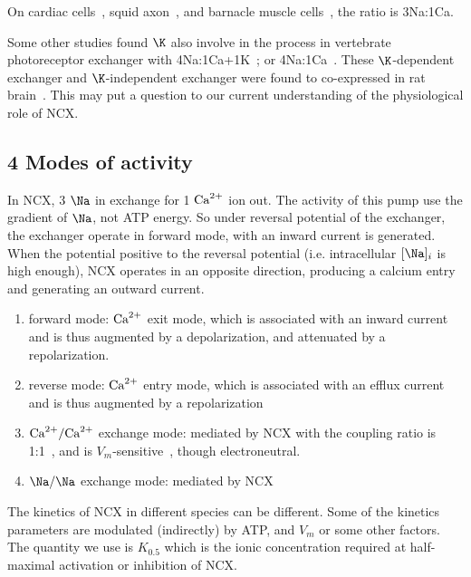 \begin{mdframed}


On cardiac cells~\citep{pitts1979, reeves1980, reeves1984, 
kimura1987,ehara1989}, squid axon~\citep{dipolo1990}, and barnacle muscle
cells~\citep{rasgado-flores1987, rasgado-flores1989}, the ratio is 3Na:1Ca.

Some other studies found $\K$ also involve in the process in vertebrate
photoreceptor exchanger with 4Na:1Ca+1K~\citep{dipoli1984, cervetto1989,
yasui1990}; or 4Na:1Ca~\citep{fukioka2000}. These $\K$-dependent exchanger and
$\K$-independent exchanger were found to co-expressed in rat
brain~\citep{tsoi1998}.  This may put a question to our current understanding of
the physiological role of NCX.

\end{mdframed}


\subsection{4 Modes of activity}
\label{sec:4-modes-activity}

In NCX, 3 $\Na$ in exchange for 1 ${\text{Ca}^{2+}}$ ion out. The activity of this pump use
the gradient of $\Na$, not ATP energy. So under reversal potential of the
exchanger, the exchanger operate in forward mode, with an inward current is
generated.
When the potential positive to the reversal potential (i.e. intracellular
$[\Na]_i$ is high enough), NCX operates in an opposite direction, producing a
calcium entry and generating an outward current.

\begin{enumerate}
\item forward mode: ${\text{Ca}^{2+}}$ exit mode, which is associated with an
  inward current and is thus augmented by a depolarization, and
  attenuated by a repolarization. 
\item reverse mode: ${\text{Ca}^{2+}}$ entry mode, which is associated with an
  efflux current and is thus augmented by a repolarization
\item ${\text{Ca}^{2+}}/{\text{Ca}^{2+}}$ exchange mode: mediated by NCX with the coupling ratio
  is 1:1~\citep{blaustein1975}, and is
  $V_m$-sensitive~\citep{dipolo1990}, though electroneutral.
\item $\Na/\Na$ exchange mode: mediated by NCX
\end{enumerate}

The kinetics of NCX in different species can be different. Some of the
kinetics parameters are modulated (indirectly) by ATP, and $V_m$ or
some other factors. The quantity we use is $K_{0.5}$ which is the
ionic concentration required at half-maximal activation or inhibition
of NCX.

